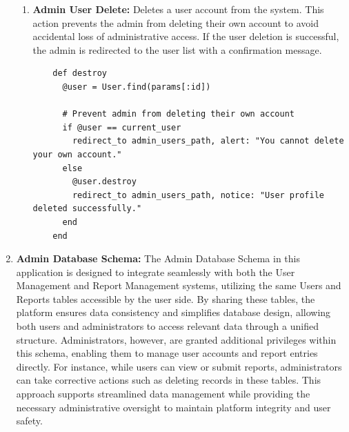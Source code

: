 \begin{enumerate}
\begin{enumerate}
            \item \textbf{Admin User Delete:} 
            Deletes a user account from the system. This action prevents the admin from deleting their own account to avoid accidental loss of administrative access. If the user deletion is successful, the admin is redirected to the user list with a confirmation message.
            \begin{lstlisting}
    def destroy
      @user = User.find(params[:id])
      
      # Prevent admin from deleting their own account
      if @user == current_user
        redirect_to admin_users_path, alert: "You cannot delete your own account."
      else
        @user.destroy
        redirect_to admin_users_path, notice: "User profile deleted successfully."
      end
    end
            \end{lstlisting}
            \end{enumerate}

        \newpage
        \item \textbf{Admin Database Schema:}
        The Admin Database Schema in this application is designed to integrate seamlessly with both the User Management and Report Management systems, utilizing the same Users and Reports tables accessible by the user side. By sharing these tables, the platform ensures data consistency and simplifies database design, allowing both users and administrators to access relevant data through a unified structure. Administrators, however, are granted additional privileges within this schema, enabling them to manage user accounts and report entries directly. For instance, while users can view or submit reports, administrators can take corrective actions such as deleting records in these tables. This approach supports streamlined data management while providing the necessary administrative oversight to maintain platform integrity and user safety.
            

\end{enumerate}
